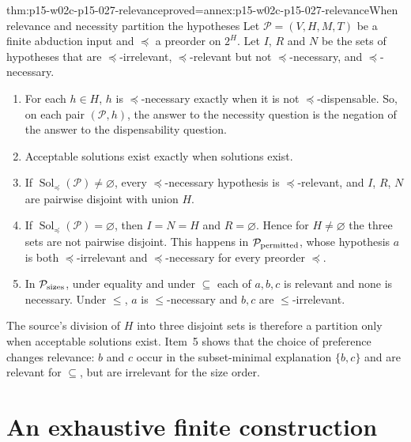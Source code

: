 \begin{hbtheorem}{thm:p15-w02c-p15-027-relevance}{proved=annex:p15-w02c-p15-027-relevance}{When relevance and necessity partition the hypotheses}
Let \(\mathcal P=(V,H,M,T)\) be a finite abduction input and \(\preceq\) a
preorder on \(2^H\). Let \(I\), \(R\) and \(N\) be the sets of hypotheses
that are \(\preceq\)-irrelevant, \(\preceq\)-relevant but not
\(\preceq\)-necessary, and \(\preceq\)-necessary.
\begin{enumerate}
\item For each \(h\in H\), \(h\) is \(\preceq\)-necessary exactly when it
      is not \(\preceq\)-dispensable. So, on each pair \((\mathcal P,h)\),
      the answer to the necessity question is the negation of the answer
      to the dispensability question.
\item Acceptable solutions exist exactly when solutions exist.
\item If \(\operatorname{Sol}_{\preceq}(\mathcal P)\ne\varnothing\), every
      \(\preceq\)-necessary hypothesis is \(\preceq\)-relevant, and \(I\),
      \(R\), \(N\) are pairwise disjoint with union \(H\).
\item If \(\operatorname{Sol}_{\preceq}(\mathcal P)=\varnothing\), then
      \(I=N=H\) and \(R=\varnothing\). Hence for \(H\ne\varnothing\) the
      three sets are not pairwise disjoint. This happens in
      \(\mathcal P_{\rm permitted}\), whose hypothesis \(a\) is both
      \(\preceq\)-irrelevant and \(\preceq\)-necessary for every
      preorder \(\preceq\).
\item In \(\mathcal P_{\rm sizes}\), under equality and under \(\subseteq\)
      each of \(a,b,c\) is relevant and none is necessary. Under \(\le\),
      \(a\) is \(\le\)-necessary and \(b,c\) are \(\le\)-irrelevant.
\end{enumerate}
\end{hbtheorem}

The source's division of \(H\) into three disjoint sets is therefore a
partition only when acceptable solutions exist. Item~5 shows that the
choice of preference changes relevance: \(b\) and \(c\) occur in the
subset-minimal explanation \(\{b,c\}\) and are relevant for \(\subseteq\),
but are irrelevant for the size order.

\section{An exhaustive finite construction}
\label{sec:p16-abduction-enumeration}

